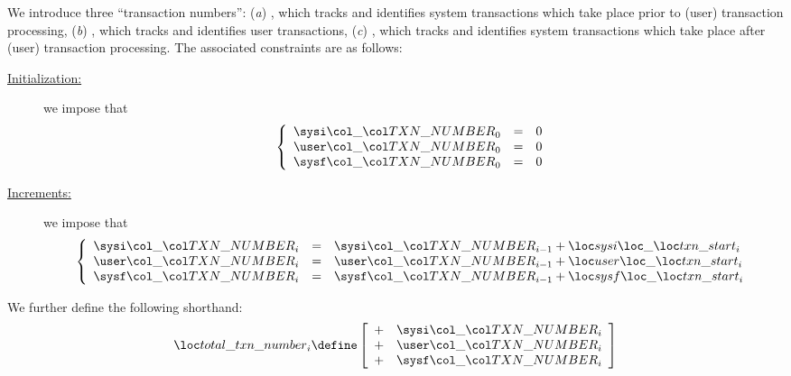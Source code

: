 We introduce three ``transaction numbers'':
(\emph{a}) \sysiTransactionNumber{}, which tracks and identifies system transactions which take place prior to (user) transaction processing,
(\emph{b}) \userTransactionNumber{}, which tracks and identifies user transactions,
(\emph{c}) \sysfTransactionNumber{}, which tracks and identifies system transactions which take place after (user) transaction processing.
The associated constraints are as follows:
\begin{description}
	\item[\underline{Initialization:}] 
		we impose that
		\[
			\left\{ \begin{array}{lcl}
				\sysiTransactionNumber _{0} & = & 0 \\
				\userTransactionNumber _{0} & = & 0 \\
				\sysfTransactionNumber _{0} & = & 0 \\
			\end{array} \right.
		\]
	\item[\underline{Increments:}] 
		we impose that
		\[
			\left\{ \begin{array}{lcl}
				\sysiTransactionNumber _{i} & = & \sysiTransactionNumber _{i - 1} + \sysiTransactionStart _{i} \\
				\userTransactionNumber _{i} & = & \userTransactionNumber _{i - 1} + \userTransactionStart _{i} \\
				\sysfTransactionNumber _{i} & = & \sysfTransactionNumber _{i - 1} + \sysfTransactionStart _{i} \\
			\end{array} \right.
		\]
\end{description}
We further define the following shorthand:
\[
	\totalTransactionNumber _{i}
	\define
	\left[ \begin{array}{cr}
		+ & \sysiTransactionNumber _{i} \\
		+ & \userTransactionNumber _{i} \\
		+ & \sysfTransactionNumber _{i} \\
	\end{array} \right]
\]
